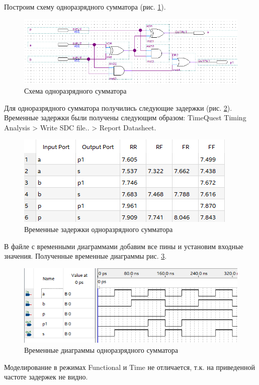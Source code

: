 \documentclass[a4paper,14pt]{article}
\begin{document}
Построим схему одноразрядного сумматора (рис. \ref{fig:041bdf}).

\begin{figure}[H]
	\centering
	\includegraphics[width=0.7\linewidth]{image/04_1_bdf}
	\caption{Схема одноразрядного сумматора}
	\label{fig:041bdf}
\end{figure}


Для одноразрядного сумматора получились следующие задержки (рис. \ref{fig:041time}). Временные задержки были получены следующим образом: TimeQuest Timing Analysis > Write SDC file.. > Report Datasheet.

\begin{figure}[H]
	\centering
	\includegraphics[width=0.7\linewidth]{image/04_1_time}
	\caption{Временные задержки одноразрядного сумматора}
	\label{fig:041time}
\end{figure}

В файле с временными диаграммами добавим все пины и установим входные значения. Полученные временные диаграммы рис. \ref{fig:041wvf}.

\begin{figure}[H]
	\centering
	\includegraphics[width=0.9\linewidth]{image/04_1_wvf}
	\caption{Временные диаграммы одноразрядного сумматора}
	\label{fig:041wvf}
\end{figure}

 Моделирование в режимах Functional и Time не отличается, т.к. на приведенной частоте задержек не видно.
 
\end{document}
